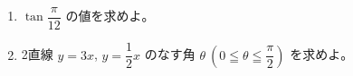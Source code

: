 \documentclass[8pt,dvipdfmx]{article}[b5paper]
\begin{document}
\begin{tcolorbox}[title=数学\textcircled{\scriptsize 3} 2-1 AB]

\begin{enumerate}[(1)]
\item $\tan \dfrac{\pi}{12}$ の値を求めよ。
\item 2直線 $y=3x$, $y=\dfrac{1}{2}x$ のなす角 $\theta\ (0\leqq\theta\leqq\dfrac{\pi}{2})$ を求めよ。
\end{enumerate}
\end{tcolorbox}




\end{document}

